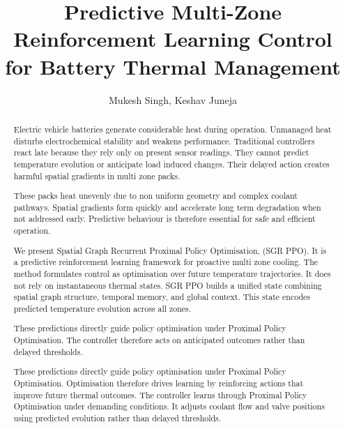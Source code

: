 \documentclass{article}
\begin{document}
\title{Predictive Multi-Zone Reinforcement Learning Control for Battery Thermal Management}

\author{Mukesh Singh, Keshav Juneja}

\maketitle


\begin{abstract}
Electric vehicle batteries generate considerable heat during operation. Unmanaged heat disturbs electrochemical stability and weakens performance. Traditional controllers react late because they rely only on present sensor readings. They cannot predict temperature evolution or anticipate load induced changes. Their delayed action creates harmful spatial gradients in multi zone packs.

These packs heat unevenly due to non uniform geometry and complex coolant pathways. Spatial gradients form quickly and accelerate long term degradation when not addressed early. Predictive behaviour is therefore essential for safe and efficient operation.

We present Spatial Graph Recurrent Proximal Policy Optimisation, (SGR PPO). It is a predictive reinforcement learning framework for proactive multi zone cooling. The method formulates control as optimisation over future temperature trajectories. It does not rely on instantaneous thermal states. SGR PPO builds a unified state combining spatial graph structure, temporal memory, and global context. This state encodes predicted temperature evolution across all zones.

These predictions directly guide policy optimisation under Proximal Policy Optimisation. The controller therefore acts on anticipated outcomes rather than delayed thresholds.

These predictions directly guide policy optimisation under Proximal Policy Optimisation. Optimisation therefore drives learning by reinforcing actions that improve future thermal outcomes. The controller learns through Proximal Policy Optimisation under demanding conditions. It adjusts coolant flow and valve positions using predicted evolution rather than delayed thresholds.


\end{abstract}
\end{document}
